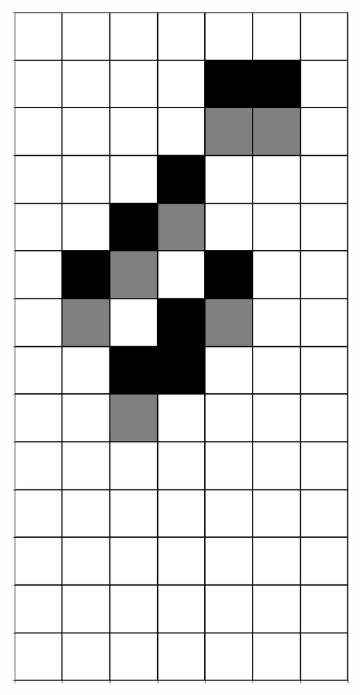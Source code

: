 \documentclass[12pt]{article}
\numberwithin{figure}{section} %
\begin{document}
\begin{figure}[H]
\begin{subfigure}{0.19\textwidth}
     \includegraphics[width=\linewidth]{Section4/15.4}
     \subcaption{}
   \end{subfigure}
      \newline
   \setcounter{subfigure}{0}
   

\end{figure}
\end{document}
